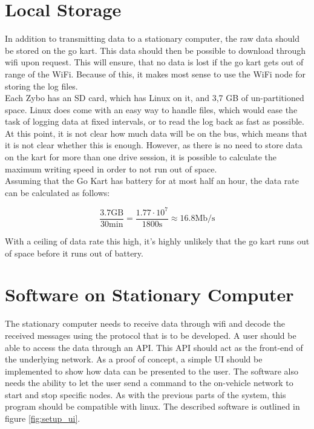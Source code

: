 
\section{Local Storage}
In addition to transmitting data to a stationary computer, the raw data should be stored on the go kart.
This data should then be possible to download through wifi upon request.
This will ensure, that no data is lost if the go kart gets out of range of the WiFi.
Because of this, it makes most sense to use the WiFi node for storing the log files.\\

Each Zybo has an SD card, which has Linux on it, and 3,7 GB of un-partitioned space. 
Linux does come with an easy way to handle files, which would ease the task of logging data at fixed intervals, or to read the log back as fast as possible.
At this point, it is not clear how much data will be on the bus, which means that it is not clear whether this is enough.
However, as there is no need to store data on the kart for more than one drive session, it is possible to calculate the maximum writing speed in order to not run out of space.\\

Assuming that the Go Kart has battery for at most half an hour, the data rate can be calculated as follows:

\begin{equation}
	\frac{3.7\mathrm{GB}}{30\si{\minute}} = \frac{1.77 \cdot 10^{7}}{1800 \si{\second}} \approx 16.8 \mathrm{Mb/s}
\end{equation}

With a ceiling of data rate this high, it's highly unlikely that the go kart runs out of space before it runs out of battery.

\section{Software on Stationary Computer}
The stationary computer needs to receive data through wifi and decode the received messages using the protocol that is to be developed.
A user should be able to access the data through an API.
This API should act as the front-end of the underlying network.
As a proof of concept, a simple UI should be implemented to show how data can be presented to the user.
The software also needs the ability to let the user send a command to the on-vehicle network to start and stop specific nodes.
As with the previous parts of the system, this program should be compatible with linux.
The described software is outlined in figure \ref{fig:setup_ui}.

